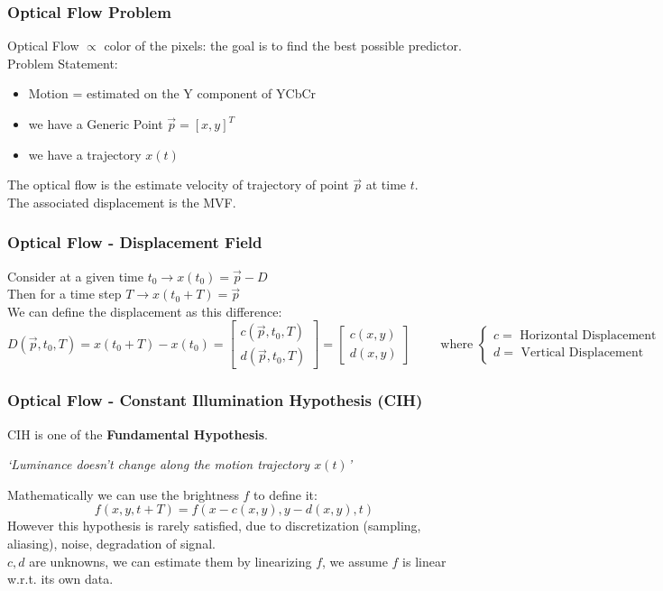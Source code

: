 \subsubsection{Optical Flow Problem}
Optical Flow $\propto$ color of the pixels: the goal is to find the best possible predictor. Problem Statement:
\begin{itemize}
    \item Motion = estimated on the Y component of YCbCr
    \item we have a Generic Point $\vec{p} = \left[x, y\right]^T$
    \item we have a trajectory $x(t)$
\end{itemize}
The optical flow is the estimate velocity of trajectory of point $\vec{p}$ at time $t$.\\
The associated displacement is the MVF.
\subsubsection{Optical Flow - Displacement Field}
Consider at a given time $t_0 \to x(t_0) = \vec{p} - {D}$\\
Then for a time step $T \to x(t_0 + T) = \vec{p}$\\
We can define the displacement as this difference:
$$D(\vec{p}, t_0, T) = x(t_0 + T) - x(t_0) = \left[\begin{matrix}
    c(\vec{p},t_0, T)\\
    d(\vec{p},t_0, T)
\end{matrix}\right] = \left[\begin{matrix}
    c(x,y)\\
    d(x,y)
\end{matrix}\right] \qquad \text{ where }\begin{cases}
    c = \text{ Horizontal Displacement}\\
    d = \text{ Vertical Displacement}
\end{cases}$$
\subsubsection{Optical Flow - Constant Illumination Hypothesis (CIH)}
CIH is one of the \textbf{Fundamental Hypothesis}.
\begin{center}
    \textit{`Luminance doesn't change along the motion trajectory $x(t)$'}
\end{center}
Mathematically we can use the brightness $f$ to define it:
$$f(x,y, t+T) = f\left(x-c(x,y),y-d(x,y),t\right)$$
However this hypothesis is rarely satisfied, due to discretization (sampling, aliasing), noise, degradation of signal.\\
$c,d$ are unknowns, we can estimate them by linearizing $f$, we assume $f$ is linear w.r.t. its own data.

